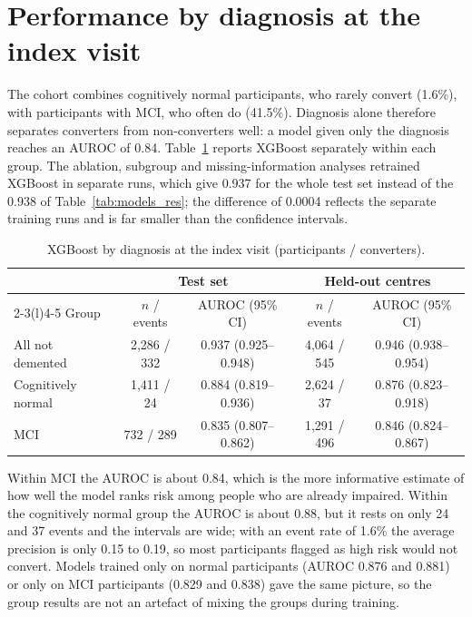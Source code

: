 \section{Performance by diagnosis at the index visit}
\label{sec:res_groups}

The cohort combines cognitively normal participants, who rarely convert (1.6\%), with participants with MCI, who often do (41.5\%). Diagnosis alone therefore separates converters from non-converters well: a model given only the diagnosis reaches an AUROC of 0.84. Table~\ref{tab:groups} reports XGBoost separately within each group. The ablation, subgroup and missing-information analyses retrained XGBoost in separate runs, which give 0.937 for the whole test set instead of the 0.938 of Table~\ref{tab:models_res}; the difference of 0.0004 reflects the separate training runs and is far smaller than the confidence intervals.

\begin{table}[H]
\centering\small
\caption{XGBoost by diagnosis at the index visit (participants / converters).}
\label{tab:groups}
\begin{tabular}{@{}lcccc@{}}
\toprule
 & \multicolumn{2}{c}{Test set} & \multicolumn{2}{c}{Held-out centres} \\
\cmidrule(lr){2-3}\cmidrule(l){4-5}
Group & $n$ / events & AUROC (95\% CI) & $n$ / events & AUROC (95\% CI) \\
\midrule
All not demented & 2,286 / 332 & 0.937 (0.925--0.948) & 4,064 / 545 & 0.946 (0.938--0.954) \\
Cognitively normal & 1,411 / 24 & 0.884 (0.819--0.936) & 2,624 / 37 & 0.876 (0.823--0.918) \\
MCI & 732 / 289 & 0.835 (0.807--0.862) & 1,291 / 496 & 0.846 (0.824--0.867) \\
\bottomrule
\end{tabular}
\end{table}

Within MCI the AUROC is about 0.84, which is the more informative estimate of how well the model ranks risk among people who are already impaired. Within the cognitively normal group the AUROC is about 0.88, but it rests on only 24 and 37 events and the intervals are wide; with an event rate of 1.6\% the average precision is only 0.15 to 0.19, so most participants flagged as high risk would not convert. Models trained only on normal participants (AUROC 0.876 and 0.881) or only on MCI participants (0.829 and 0.838) gave the same picture, so the group results are not an artefact of mixing the groups during training.

